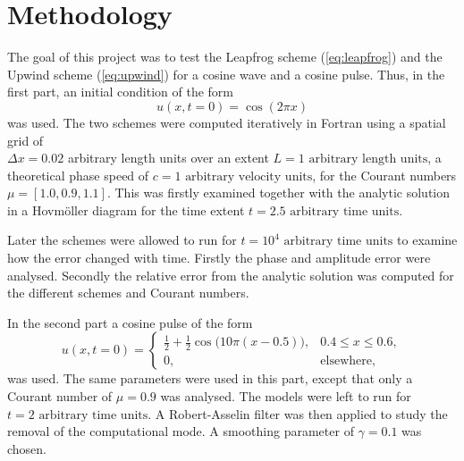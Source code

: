 \section{Methodology}
The goal of this project was to test the Leapfrog scheme (\autoref{eq:leapfrog}) and the Upwind scheme (\autoref{eq:upwind}) for a cosine wave and a cosine pulse. Thus, in the first part, an initial condition of the form
\begin{equation}
    u(x,t=0) = \cos\left(2\pi x\right)
\end{equation}
was used. The two schemes were computed iteratively in Fortran using a spatial grid of \\ $\Delta x=0.02$ arbitrary length units over an extent $L=1\text{ arbitrary length units}$, a theoretical phase speed of $c=1 \text{ arbitrary velocity units}$, for the Courant numbers $\mu=[1.0, 0.9, 1.1]$. This was firstly examined together with the analytic solution in a Hovmöller diagram for the time extent $t=2.5 \text{ arbitrary time units}$. 

Later the schemes were allowed to run for $t=10^4 \text{ arbitrary time units}$ to examine how the error changed with time. Firstly the phase and amplitude error were analysed. Secondly the relative error from the analytic solution was computed for the different schemes and Courant numbers.  

In the second part a cosine pulse of the form 
\begin{equation}
    u(x, t=0) =
\begin{cases}
\frac{1}{2} + \frac{1}{2}\cos\bigl(10\pi(x - 0.5)\bigr), & 0.4 \le x \le 0.6, \\
0, & \text{elsewhere,}
\end{cases}
\end{equation}
was used. The same parameters were used in this part, except that only a Courant number of $\mu=0.9$ was analysed. The models were left to run for $t=2\text{ arbitrary time units}$. A Robert-Asselin filter was then applied to study the removal of the computational mode. A smoothing parameter of $\gamma=0.1$ was chosen. 
